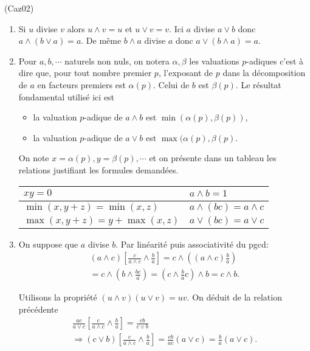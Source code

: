 \begin{tiny}(Caz02)\end{tiny} 
\begin{enumerate}
 \item Si $u$ divise $v$ alors $u \wedge v = u$ et $u \vee v = v$. Ici $a$ divise $a\vee b$ donc 
$a\wedge(b \vee a) = a$. De même $b\wedge a$ divise $a$ donc $a \vee (b \wedge a) = a$.

  \item Pour $a, b, \cdots$ naturels non nuls, on notera $\alpha, \beta$ les valuations $p$-adiques c'est à dire que, pour tout nombre premier $p$, l'exposant de $p$ dans la décomposition de $a$ en facteurs premiers est $\alpha(p)$. Celui de $b$ est $\beta(p)$. Le résultat fondamental utilisé ici est
\begin{itemize}
 \item la valuation $p$-adique de $a\wedge b$ est $\min(\alpha(p), \beta(p))$,
 \item la valuation $p$-adique de $a\vee b$ est $\max(\alpha(p), \beta(p)$.
\end{itemize}
On note $x=\alpha(p), y = \beta(p), \cdots$ et on présente dans un tableau les relations justifiant les formules demandées.

\begin{center}
\renewcommand{\arraystretch}{1.3}
\begin{tabular}{|l|l|} \hline
 $xy = 0$ & $a\wedge b  = 1$ \\ \hline
 $\min(x, y + z) = \min(x,z)$ & $a\wedge(bc) = a \wedge c$ \\ \hline
 $\max(x, y + z) = y + \max(x,z)$ & $a\vee(bc) = a \vee c$ \\ \hline
\end{tabular} 
\end{center}

 \item On suppose que $a$ divise $b$. Par linéarité puis associativité du pgcd:
\begin{multline*}
 (a\wedge c)\left[ \frac{c}{a\wedge c} \wedge \frac{b}{a}\right]
 = c \wedge \left( (a\wedge c)\frac{b}{a}\right) \\
 = c \wedge \left( b \wedge \frac{bc}{a}\right)
 = \left( c \wedge \frac{b}{a}c\right)  \wedge b = c \wedge b.
\end{multline*}

Utilisons la propriété $(u \wedge v) (u \vee v) = uv$.\newline 
On déduit de la relation précédente
\begin{multline*}
\frac{ac}{a\vee c}\left[ \frac{c}{a\wedge c} \wedge \frac{b}{a}\right] 
 = \frac{cb}{ c \vee b}\\
 \Rightarrow 
(c \vee b) \left[ \frac{c}{a\wedge c} \wedge \frac{b}{a}\right] 
 = \frac{cb}{ac }(a\vee c) = \frac{b}{a}(a\vee c).
\end{multline*}


\end{enumerate}
